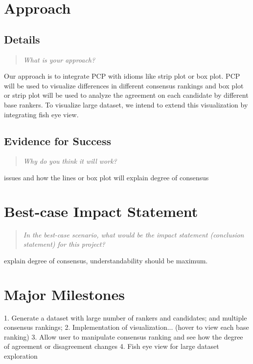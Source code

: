 \documentclass{proc}
\begin{document}
\section{Approach}
\subsection{Details}
\begin{quote}
\textit{What is your approach?}
\end{quote}

Our approach is to integrate PCP with idioms like strip plot or box plot. PCP will be used to visualize differences in different consensus rankings and box plot or strip plot will be used to analyze the agreement on each candidate by different base rankers. To visualize large dataset, we intend to extend this visualization by integrating fish eye view.


\subsection{Evidence for Success}
\begin{quote}
\textit{Why do you think it will work?} 
\end{quote}

issues and how the lines or box plot will explain degree of consensus

\section{Best-case Impact Statement}
\begin{quote}
\textit{In the best-case scenario, what would be the impact statement (conclusion statement) for this project? \cite{wijk2005value, pike2009science}}
\end{quote}

explain degree of consensus, understandability should be maximum.

\section{Major Milestones}

1. Generate a dataset with large number of rankers and candidates; and multiple consensus rankings;
2. Implementation of visualization... (hover to view each base ranking)
3. Allow user to manipulate consensus ranking and see how the degree of agreement or disagreement changes
4. Fish eye view for large dataset exploration
\end{document}
